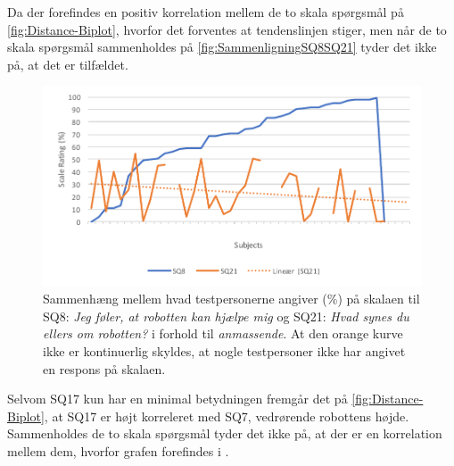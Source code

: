 Da der forefindes en positiv korrelation mellem de to skala spørgsmål på \autoref{fig:Distance-Biplot}, hvorfor det forventes at tendenslinjen stiger, men når de to skala spørgsmål sammenholdes på \autoref{fig:SammenligningSQ8SQ21} tyder det ikke på, at det er tilfældet.  
%
\begin{figure}[H]
	\centering
	\includegraphics[width=\textwidth]{Figure/Korrelationsgrafer/SQ8+SQ21}
	\caption{Sammenhæng mellem hvad testpersonerne angiver (\%) på skalaen til SQ8: \textit{Jeg føler, at robotten kan hjælpe mig} og SQ21: \textit{Hvad synes du ellers om robotten?} i forhold til \textit{anmassende}. At den orange kurve ikke er kontinuerlig skyldes, at nogle testpersoner ikke har angivet en respons på skalaen.}
	\label{fig:SammenligningSQ8SQ21}
\end{figure}
\noindent
%
Selvom SQ17 kun har en minimal betydningen fremgår det på \autoref{fig:Distance-Biplot}, at SQ17 er højt korreleret med SQ7, vedrørende robottens højde. Sammenholdes de to skala spørgsmål tyder det ikke på, at der er en korrelation mellem dem, hvorfor grafen forefindes i .

